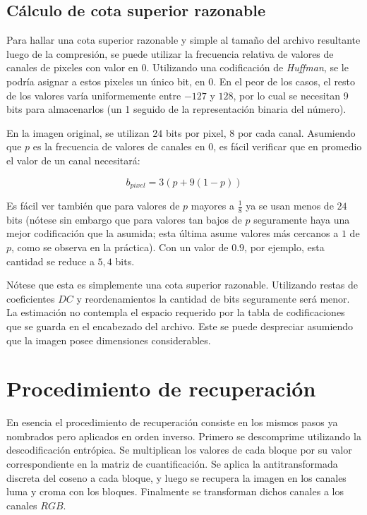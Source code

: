 \documentclass[%
	final,
	reprint,
	notitlepage,
	narroweqnarray,
	inline,
	twoside,
	invited
	]{ieee}
\begin{document}
\subsection{Cálculo de cota superior razonable}

\par Para hallar una cota superior razonable y simple al tamaño del archivo resultante luego de la compresión,
 se puede 
utilizar la frecuencia relativa de valores de canales de pixeles con valor en 0. 
Utilizando una codificación de \textit{Huffman}, 
se le podría asignar a estos pixeles un único bit, en 0. En el peor de los casos, el resto de los valores 
varía uniformemente entre $-127$ y $128$, por lo cual se necesitan 9 bits para almacenarlos (un 1 seguido 
de la representación binaria del número).
\par En la imagen original, se utilizan $24$ bits por pixel, $8$ por cada canal. Asumiendo que $p$ es la frecuencia 
de valores de canales en 0, es fácil verificar que en promedio el valor de un canal necesitará:

\begin{equation}
b_{pixel}=3(p+9(1-p))
\end{equation}

\par Es fácil ver también que para valores de $p$ mayores a $\frac{1}{8}$ ya se usan menos de $24$ bits (nótese sin 
embargo que para valores tan bajos de $p$ seguramente haya una mejor codificación que la asumida; esta última asume 
valores más cercanos a $1$ de $p$, como se observa en la práctica). Con un valor de $0.9$, por ejemplo, esta cantidad 
se reduce a $5,4$ bits.
\par Nótese que esta es simplemente una cota superior razonable. Utilizando restas de coeficientes $DC$ y reordenamientos 
la cantidad de bits seguramente será menor. La estimación no contempla el espacio requerido por la tabla de codificaciones 
que se guarda en el encabezado del archivo. Este se puede despreciar asumiendo que la imagen posee dimensiones considerables.



\section{Procedimiento de recuperación}

En esencia el procedimiento de recuperación consiste en los mismos pasos ya nombrados pero aplicados 
en orden inverso. Primero se descomprime utilizando la descodificación entrópica. Se multiplican 
los valores de cada bloque por su valor correspondiente en la matriz de cuantificación. Se aplica la 
antitransformada discreta del coseno a cada bloque, y luego se recupera la imagen en los canales luma y croma 
con los bloques. Finalmente se transforman dichos canales a los canales $RGB$.
\end{document}
